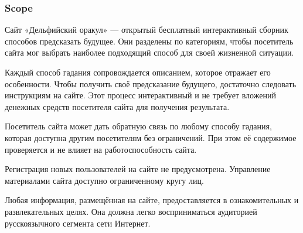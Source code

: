 \subsubsection{Scope}

Сайт «Дельфийский оракул» --- открытый бесплатный интерактивный сборник способов предсказать будущее. Они разделены по категориям, чтобы посетитель сайта мог выбрать наиболее подходящий способ для своей жизненной ситуации.

Каждый способ гадания сопровождается описанием, которое отражает его особенности. Чтобы получить своё предсказание будущего, достаточно следовать инструкциям на сайте. Этот процесс интерактивный и не требует вложений денежных средств посетителя сайта для получения результата.

Посетитель сайта может дать обратную связь по любому способу гадания, которая доступна другим посетителям без ограничений. При этом её содержимое проверяется и не влияет на работоспособность сайта.

Регистрация новых пользователей на сайте не предусмотрена. Управление материалами сайта доступно ограниченному кругу лиц.

Любая информация, размещённая на сайте, предоставляется в ознакомительных и развлекательных целях. Она должна легко восприниматься аудиторией русскоязычного сегмента сети Интернет.